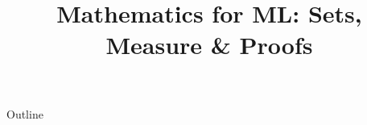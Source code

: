 \documentclass[xcolor=dvipsnames,compress,t,pdf,9pt]{beamer}
\title[\insertframenumber /\inserttotalframenumber]{Mathematics for ML: Sets, Measure \& Proofs}
\begin{document}
	\begin{frame}
	\titlepage
	\end{frame}

	\begin{frame}{Outline}
	    \tableofcontents
	\end{frame}

	
	
	
	
\end{document}
